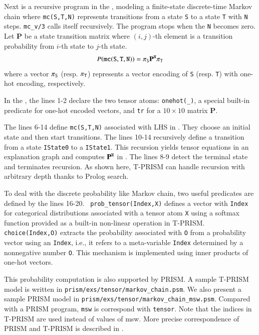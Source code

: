 \documentclass[a4paper]{report}
\newcommand{\mvec}[1]{\mathbf{#1}}
\newcommand{\mmat}[1]{\mathbf{#1}}
\begin{document}
Next  is a  recursive  program in  the  , modeling  a
finite-state  discrete-time   Markov  chain  where   {\tt  mc(S,T,N)}
represents transitions  from a state {\tt  S} to a state  {\tt T} with
{\tt N} steps.   {\tt mc\_v/3} calls itself  recursively.  The program
stops when the {\tt N} becomes zero.
%
Let $\mmat{P}$ be  a state transition matrix  where $(i,j)$-th element
is a transition probability from $i$-th state to $j$-th state.
%
\begin{equation}
P({\tt mc(S,T,N)} )=\mvec{\pi}_{\tt S}\mmat{P}^{\tt N}\mvec{\pi}_{\tt T}
\label{eq:mc}
\end{equation}
%
where  a vector  $\mvec{\pi}_{\tt  S}$  (resp.  $\mvec{\pi}_{\tt  T}$)
represents a vector  encoding of {\tt S} (resp. {\tt  T}) with one-hot
encoding, respectively.


In the , the lines 1-2 declare the two tensor atoms:
{\tt  onehot(\_)}, a  special built-in  predicate for  one-hot encoded
vectors, and {\tt tr} for a $10 \times 10$ matrix $\mmat{P}$. 

The   lines  6-14   define   {\tt  mc(S,T,N)}   associated  with   LHS
in .   They choose  an initial  state and  then start
transitions.  The lines  10-14 recursively define a  transition from a
state {\tt IState0} to a  {\tt IState1}.  This recursion yields tensor
equations  in an  explanation  graph and  computes $\mmat{P}^{\tt  N}$
in .   The lines  8-9 detect  the terminal  state and
terminates  recursion.  As  shown here,  T-PRISM can  handle recursion
with arbitrary depth thanks to Prolog search.

To deal  with the discrete  probability like Markov chain,  two useful
predicates    are    defined    by     the    lines    16-20.     {\tt
	prob\_tensor(Index,X)}  defines   a  vector   with  {\tt   Index}  for
categorical distributions associated with a  tensor atom {\tt X} using
a  softmax function  provided as  a built-in  non-linear operation  in
T-PRISM.   {\tt choice(Index,O)}  extracts the  probability associated
with {\tt O} from a probability  vector using an {\tt Index}, i.e., it
refers  to a  meta-variable {\tt  Index} determined  by a  nonnegative
number {\tt O}.  This mechanism is implemented using inner products of
one-hot vectors.

This probability computation is also supported by PRISM.
A sample T-PRISM model is written in {\tt prism/exs/tensor/markov\_chain.psm}.
We also present a sample PRISM model in {\tt prism/exs/tensor/markov\_chain\_msw.psm}. 
Compared with a PRISM program, {\tt msw} is correspond with {\tt tensor}.
Note that the indices in T-PRISM are used instead of values of msw.
More precise correspondence of PRISM and T-PRISM is described in .
\end{document}
